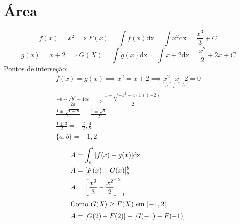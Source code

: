 \documentclass{jhwhw}
\newcommand{\dx}{\mathrm{dx}}
\begin{document}
\part{Área}
\[f(x) = x^2 \implies F(x) = \int f(x) \dx = \int x^2 \dx = \boxed{\frac{x^3}{3} + C}\]
\[g(x) = x+2 \implies G(X) = \int g(x) \dx = \int x+2 \dx = \boxed{\frac{x^2}{2} + 2x + C}\]
Pontos de interseção:
\begin{multline*}
    f(x) = g(x) \implies x^2 = x+2 \implies 
    \underbrace{x^2}_a \underbrace{-x}_b \underbrace{-2}_c = 0 \\
    \frac{-b \pm \sqrt{b^2-4ac}}{2a} \implies \frac{1 \pm \sqrt{-1^2 - 4(1)(-2)}}{2} = \\
    \frac{1 \pm \sqrt{1 + 8}}{2} = 
    \frac{1 \pm \sqrt{9}}{2} = \\
    \frac{1 \pm 3}{2} = 
    -\frac{2}{2}, \frac{4}{2}\\
    \boxed{\{a, b\} = -1, 2} 
\end{multline*}
\begin{align*} 
    A & = \int_{a}^{b} [f(x) - g(x)] \dx \\
    A & = [F(x) - G(x)]_a^b \\
    A & = \left[\frac{x^3}{3} - \frac{x^2}{2}\right]_{-1}^2 \\
    \shortintertext{Como $G(X) \geq F(X)$ em $[-1, 2]$}
    A & = [G(2) - F(2)] - [G(-1) - F(-1)] 
\end{align*}
\end{document}
